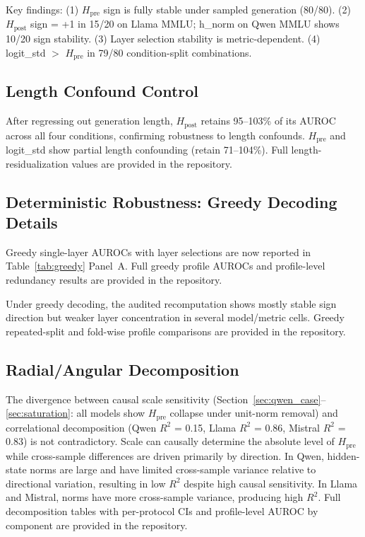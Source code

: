 \documentclass{ieeeaccess}
\newcommand{\Hpre}{H_{\text{pre}}}
\newcommand{\Hpost}{H_{\text{post}}}
\begin{document}
Key findings: (1) $\Hpre$ sign is fully stable under sampled generation (80/80). (2) $\Hpost$ sign = +1 in 15/20 on Llama MMLU; h\_norm on Qwen MMLU shows 10/20 sign stability. (3) Layer selection stability is metric-dependent. (4) logit\_std $>$ $\Hpre$ in 79/80 condition-split combinations.

\subsection{Length Confound Control}
\label{app:length}

After regressing out generation length, $\Hpost$ retains 95--103\% of its AUROC across all four conditions, confirming robustness to length confounds. $\Hpre$ and logit\_std show partial length confounding (retain 71--104\%). Full length-residualization values are provided in the repository.

\subsection{Deterministic Robustness: Greedy Decoding Details}
\label{app:greedy}

Greedy single-layer AUROCs with layer selections are now reported in Table~\ref{tab:greedy} Panel~A. Full greedy profile AUROCs and profile-level redundancy results are provided in the repository.

Under greedy decoding, the audited recomputation shows mostly stable sign direction but weaker layer concentration in several model/metric cells. Greedy repeated-split and fold-wise profile comparisons are provided in the repository.


\subsection{Radial/Angular Decomposition}
\label{app:radial}

The divergence between causal scale sensitivity (Section~\ref{sec:qwen_case}--\ref{sec:saturation}: all models show $\Hpre$ collapse under unit-norm removal) and correlational decomposition (Qwen $R^2$ = 0.15, Llama $R^2$ = 0.86, Mistral $R^2$ = 0.83) is not contradictory. Scale can causally determine the absolute level of $\Hpre$ while cross-sample differences are driven primarily by direction. In Qwen, hidden-state norms are large and have limited cross-sample variance relative to directional variation, resulting in low $R^2$ despite high causal sensitivity. In Llama and Mistral, norms have more cross-sample variance, producing high $R^2$. Full decomposition tables with per-protocol CIs and profile-level AUROC by component are provided in the repository.
\end{document}
